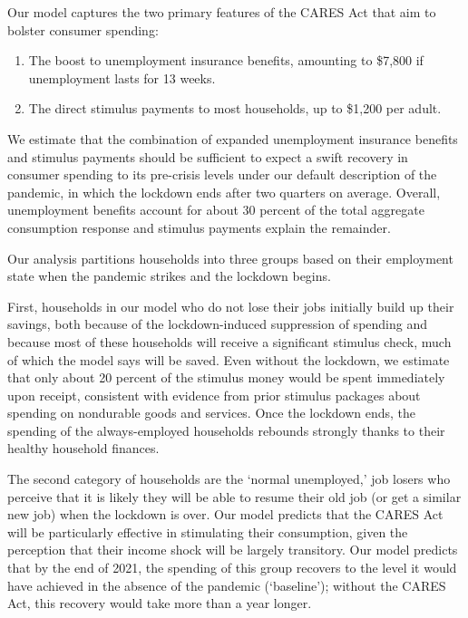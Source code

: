 \documentclass[titlepage,a4paper]{\econtex}
\begin{document}
Our model captures the two primary features of the CARES Act that aim to bolster consumer spending:
\begin{enumerate}
\item The boost to unemployment insurance benefits, amounting to \$7,800 if unemployment lasts for 13 weeks.
\item The direct stimulus payments to most households, up to \$1,200 per adult.
\end{enumerate}

We estimate that the combination of expanded unemployment insurance benefits and stimulus payments should be sufficient to expect a swift recovery in consumer spending to its pre-crisis levels under our default description of the pandemic, in which the lockdown ends after two quarters on average.
Overall, unemployment benefits account for about 30 percent of the total aggregate consumption response and stimulus payments explain the remainder.

Our analysis partitions households into three groups based on their employment state when the pandemic strikes and the lockdown begins.

First, households in our model who do not lose their jobs initially build up their savings, both because of the lockdown-induced suppression of spending and because most of these households will receive a significant stimulus check, much of which the model says will be saved.
Even without the lockdown, we estimate that only about 20 percent of the stimulus money would be spent immediately upon receipt, consistent with evidence from prior stimulus packages about spending on nondurable goods and services.
Once the lockdown ends, the spending of the always-employed households rebounds strongly thanks to their healthy household finances.%

The second category of households are the `normal unemployed,' job losers who perceive that it is likely they will be able to resume their old job (or get a similar new job) when the lockdown is over.
Our model predicts that the CARES Act will be particularly effective in stimulating their consumption, given the perception that their income shock will be largely transitory.  Our model predicts that by the end of 2021, the spending of this group recovers to the level it would have achieved in the absence of the pandemic (`baseline'); without the CARES Act, this recovery would take more than a year longer.
\end{document}
